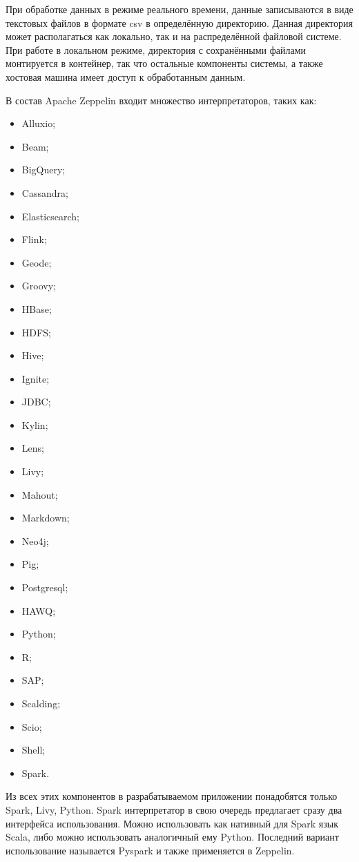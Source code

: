 При обработке данных в режиме реального времени, данные записываются в виде текстовых файлов в формате csv в определённую директорию.
Данная директория может располагаться как локально, так и на распределённой файловой системе.
При работе в локальном режиме, директория с сохранёнными файлами монтируется в контейнер, так что остальные компоненты системы, а также хостовая машина имеет доступ к обработанным данным.

В состав Apache Zeppelin входит множество интерпретаторов, таких как:
\begin{itemize}
    \item Alluxio;
    \item Beam;
    \item BigQuery;
    \item Cassandra;
    \item Elasticsearch;
    \item Flink;
    \item Geode;
    \item Groovy;
    \item HBase;
    \item HDFS;
    \item Hive;
    \item Ignite;
    \item JDBC;
    \item Kylin;
    \item Lens;
    \item Livy;
    \item Mahout;
    \item Markdown;
    \item Neo4j;
    \item Pig;
    \item Postgresql;
    \item HAWQ;
    \item Python;
    \item R;
    \item SAP;
    \item Scalding;
    \item Scio;
    \item Shell;
    \item Spark.
\end{itemize}

Из всех этих компонентов в разрабатываемом приложении понадобятся только Spark, Livy, Python.
Spark интерпретатор в свою очередь предлагает сразу два интерфейса использования.
Можно использовать как нативный для Spark язык Scala, либо можно использовать аналогичный ему Python.
Последний вариант использование называется Pyspark и также применяется в Zeppelin.

